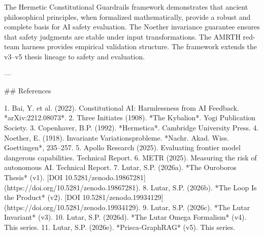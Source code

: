 The Hermetic Constitutional Guardrails framework demonstrates that ancient philosophical principles, when formalized mathematically, provide a robust and complete basis for AI safety evaluation. The Noether invariance guarantee ensures that safety judgments are stable under input transformations. The AMRTH red-team harness provides empirical validation structure. The framework extends the v3--v5 thesis lineage to safety and evaluation.

---

## References

1. Bai, Y. et al. (2022). Constitutional AI: Harmlessness from AI Feedback. *arXiv:2212.08073*.
2. Three Initiates (1908). *The Kybalion*. Yogi Publication Society.
3. Copenhaver, B.P. (1992). *Hermetica*. Cambridge University Press.
4. Noether, E. (1918). Invariante Variationsprobleme. *Nachr. Akad. Wiss. Goettingen*, 235--257.
5. Apollo Research (2025). Evaluating frontier model dangerous capabilities. Technical Report.
6. METR (2025). Measuring the risk of autonomous AI. Technical Report.
7. Lutar, S.P. (2026a). *The Ouroboros Thesis* (v1). [DOI 10.5281/zenodo.19867281](https://doi.org/10.5281/zenodo.19867281).
8. Lutar, S.P. (2026b). *The Loop Is the Product* (v2). [DOI 10.5281/zenodo.19934129](https://doi.org/10.5281/zenodo.19934129).
9. Lutar, S.P. (2026c). *The Lutar Invariant* (v3).
10. Lutar, S.P. (2026d). *The Lutar Omega Formalism* (v4). This series.
11. Lutar, S.P. (2026e). *Prisca-GraphRAG* (v5). This series.
